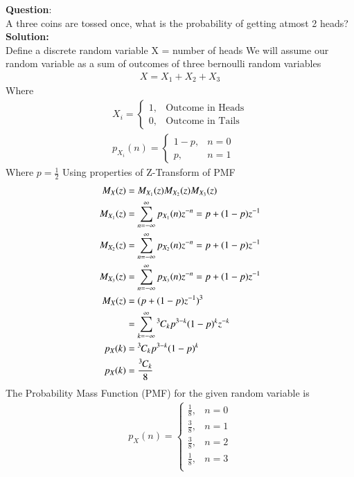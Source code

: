 \documentclass[journal]{IEEEtran}
\begin{document}
\textbf{Question}:\\
A three coins are tossed once, what is the probability of getting atmost 2 heads?
\\
\textbf{Solution: }\\
Define a discrete random variable X = number of heads\newline
We will assume our random variable as a sum of outcomes of three bernoulli random variables
\begin{align}
	X = X_1+X_2+X_3
\end{align}
Where
\begin{align}
X_i = 
\begin{cases}
	1, & \text{Outcome in Heads}\\
	0, & \text{Outcome in Tails}
\end{cases}\\
p_{X_i}(n) = 
\begin{cases}
	1-p, & n = 0\\
	p, & n = 1
\end{cases}
\end{align}
Where $p=\frac{1}{2}$\newline
Using properties of Z-Transform of PMF
\begin{align}
	M_X(z) &= M_{X_1}(z)M_{X_2}(z)M_{X_3}(z)\\
	M_{X_1}(z) &= \sum_{n=-\infty}^{\infty}p_{X_1}(n)z^{-n} = p+(1-p)z^{-1}\\
	M_{X_2}(z) &= \sum_{n=-\infty}^{\infty}p_{X_2}(n)z^{-n} = p+(1-p)z^{-1}\\
	M_{X_3}(z) &= \sum_{n=-\infty}^{\infty}p_{X_3}(n)z^{-n} = p+(1-p)z^{-1}\\
	M_X(z) &= (p+(1-p)z^{-1})^3\\
	 &= \sum_{k=-\infty}^{\infty}{{}^{3}\mkern-1muC_{k}}p^{3-k}(1-p)^kz^{-k}\\
	p_{X}(k) &= {{}^{3}\mkern-1muC_{k}}p^{3-k}(1-p)^{k}\\
	p_{X}(k) &= \frac{{{}^{3}\mkern-1muC_{k}}}{8}
\end{align}
The Probability Mass Function (PMF) for the given random variable is
\begin{align}
p_X(n) =
\begin{cases}
	\frac{1}{8}, & n = 0 \\
	\frac{3}{8}, & n = 1 \\
	\frac{3}{8}, & n = 2 \\
	\frac{1}{8}, & n = 3 \\
\end{cases}
\end{align}
\end{document}
